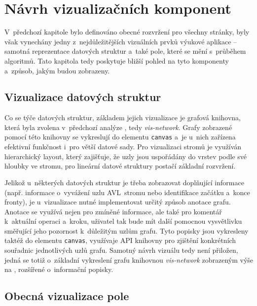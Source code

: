 \section{Návrh vizualizačních komponent}
\label{sec:visualization-components}

V~předchozí kapitole bylo definováno obecné rozvržení pro všechny stránky, byly však vynechány jedny z~nejdůležitějších vizuálních prvků výukové aplikace -- samotná reprezentace datových struktur a~také pole, které se mění s~průběhem algoritmů.
Tato kapitola tedy poskytuje bližší pohled na tyto komponenty a~způsob, jakým budou zobrazeny.

\subsection{Vizualizace datových struktur}
\label{subsec:structure-visualization}

Co se týče datových struktur, základem jejich vizualizace je grafová knihovna, která byla zvolena v~předchozí analýze , tedy \textit{vis-network}.
Grafy zobrazené pomocí této knihovny se vykreslují do elementu \texttt{canvas} a~je u~nich zařízena efektivní funkčnost i~pro větší datové sady.
Pro vizualizaci stromů je využíván hierarchický layout, který zajišťuje, že uzly jsou uspořádány do vrstev podle své hloubky ve stromu, pro lineární datové struktury postačí základní rozvržení.

Jelikož u~některých datových struktur je třeba zobrazovat doplňující informace (např. informace o~vyvážení uzlu AVL~stromu nebo identifikace začátku a~konce fronty), je u~vizualizace nutné implementovat určitý způsob anotace grafu.
Anotace se využívá nejen pro zmíněné informace, ale také pro komentář k~aktuální operaci a~kroku, uživatel tak bude mít další pomocnou vysvětlivku směřující jeho pozornost k~důležitým uzlům grafu.
Tyto popisky jsou vykresleny taktéž do elementu \texttt{canvas}, využívaje API knihovny pro zjištění konkrétních souřadnic jednotlivých uzlů grafu.
Samotný návrh vizuálu tedy není přiložen, jedná se totiž o~základní vykreslení grafu knihovnou \textit{vis-network} zobrazeným výše na , rozšířené o~informační popisky.

\subsection{Obecná vizualizace pole}
\label{subsec:general-array-visualization}

